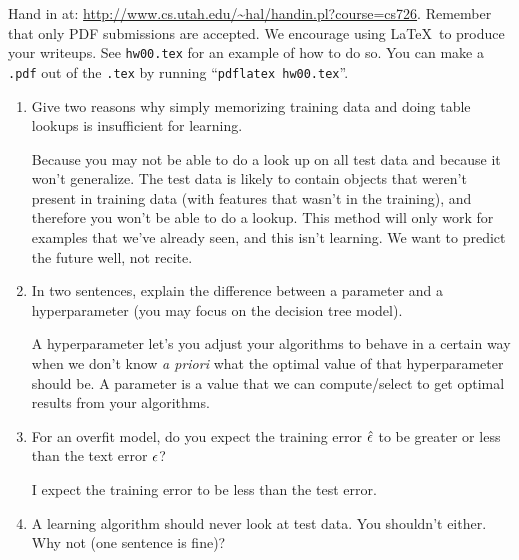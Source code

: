 \documentclass[fleqn]{article}
\begin{document}


Hand in at: \url{http://www.cs.utah.edu/~hal/handin.pl?course=cs726}.
Remember that only PDF submissions are accepted.  We encourage using
\LaTeX\ to produce your writeups.  See \verb+hw00.tex+ for an example
of how to do so.  You can make a \verb+.pdf+ out of the \verb+.tex+ by
running ``\verb+pdflatex hw00.tex+''.

\begin{enumerate}
\item Give two reasons why simply memorizing training data and doing
  table lookups is insufficient for learning.

\begin{solution}
  Because you may not be able to do a look up on all test data and because it won't generalize. The test data is likely to contain objects
  that weren't present in training data (with features that wasn't in
  the training), and therefore you won't be able to do a lookup. This
  method will only work for examples that we've already seen, and this
  isn't learning. We want to predict the future well, not recite.
\end{solution}  

\item In two sentences, explain the difference between a parameter and
  a hyperparameter (you may focus on the decision tree model).

\begin{solution}
  A hyperparameter let's you adjust your algorithms to behave in a
  certain way when we don't know \emph{a priori} what the optimal
  value of that hyperparameter should
  be. A parameter is a value that we can compute/select to get optimal
  results from your algorithms.
\end{solution}  

\item For an overfit model, do you expect the training error $\hat
  {\epsilon}$ to be greater or less than the text error $\epsilon$?

\begin{solution}
  I expect the training error to be less than the test error.
\end{solution}  

\item A learning algorithm should never look at test data.  You
  shouldn't either.  Why not (one sentence is fine)?


\end{enumerate}
\end{document}
